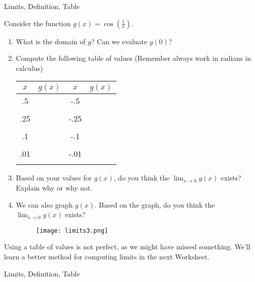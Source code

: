 \begin{tagblock}{Limits, Definition, Table}
\begin{question}
	\item Consider the function $\displaystyle g(x) = \cos (\frac{1}{x})$. 
 \begin{enumerate}
\item What is the domain of $g$?  Can we evaluate $g(0)$?  
\bigskip

\item Compute the following table of values (Remember always work in radians in calculus)


\begin{tabular}{c | c c | c  }
$x$ & $g(x)$  \hspace{2in} & $x$ & $g(x)$ \\ \hline
.5 & \hspace{.5in} & -.5 &  \\ &&& \\
.25 & & -.25  & \\ &&&\\
.1 & & -.1& \\&&& \\
.01 && -.01 &\\ &&&\\
\end{tabular}
  \item Based on your values for $g(x)$, do you think the $\displaystyle \lim_{x \to 0} g(x)$ exists?  Explain why or why not.  
  
  \vspace{1in}
  \item We can also graph $g(x)$.  Based on the graph, do you think the $\displaystyle \lim_{x \to 0} g(x)$ exists?
  \begin{figure}[h]
\centering
\texttt{[image: limits3.png]}
\end{figure}


\end{enumerate}




Using a table of values is not perfect, as we might have missed something.  We'll learn a better method for computing limits in the next Worksheet. 
	
	
\begin{tags}
	    Limits, Definition, Table
\end{tags}
	
\begin{diary}
	    
\end{diary}
	
\begin{solution}
	  
\end{solution}
	
\end{question}

\end{tagblock}

